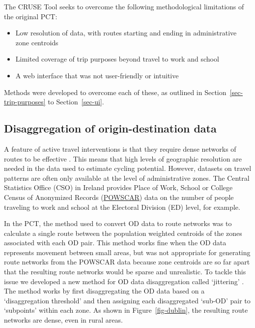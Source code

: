 \documentclass[
  super,
  preprint,
  3p]{elsarticle}
\providecommand{\tightlist}{%
  \setlength{\itemsep}{0pt}\setlength{\parskip}{0pt}}\usepackage{longtable,booktabs,array}
\begin{document}
The CRUSE Tool seeks to overcome the following methodological
limitations of the original PCT:

\begin{itemize}
\tightlist
\item
  Low resolution of data, with routes starting and ending in
  administrative zone centroids
\item
  Limited coverage of trip purposes beyond travel to work and school
\item
  A web interface that was not user-friendly or intuitive
\end{itemize}

Methods were developed to overcome each of these, as outlined in
Section~\ref{sec-trip-purposes} to Section~\ref{sec-ui}.

\hypertarget{sec-disaggregation}{%
\subsection{Disaggregation of origin-destination
data}\label{sec-disaggregation}}

A feature of active travel interventions is that they require dense
networks of routes to be effective \citep{parkin2018}. This means that
high levels of geographic resolution are needed in the data used to
estimate cycling potential. However, datasets on travel patterns are
often only available at the level of administrative zones. The Central
Statistics Office (CSO) in Ireland provides Place of Work, School or
College Census of Anonymized Records
(\href{https://www.cso.ie/en/census/census2016reports/powscar/}{POWSCAR})
data on the number of people traveling to work and school at the
Electoral Division (ED) level, for example.

In the PCT, the method used to convert OD data to route networks was to
calculate a single route between the population weighted centroids of
the zones associated with each OD pair. This method works fine when the
OD data represents movement between small areas, but was not appropriate
for generating route networks from the POWSCAR data because zone
centroids are so far apart that the resulting route networks would be
sparse and unrealistic. To tackle this issue we developed a new method
for OD data disaggregation called `jittering' \citep{lovelace2022}. The
method works by first disaggregating the OD data based on a
`disaggregation threshold' and then assigning each disaggregated
`sub-OD' pair to `subpoints' within each zone. As shown in
Figure~\ref{fig-dublin}, the resulting route networks are dense, even in
rural areas.
\end{document}
